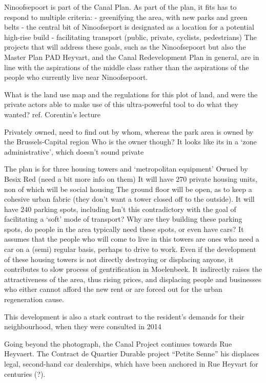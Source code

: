 \documentclass{article}[11pt]
\begin{document}
Ninoofsepoort is part of the Canal Plan. As part of the plan, it fits has to respond to multiple criteria:\cite{diagnosticNinove}
- greenifying the area, with new parks and green belts
- the central bit of Ninoofseport is designated as a location for a potential high-rise build
- facilitating transport (public, private, cyclists, pedestrians)
The projects that will address these goals, such as the Ninoofsepoort but also the Master Plan PAD Heyvart, and the Canal Redevelopment Plan in general, are in line with the aspirations of the middle class rather than the aspirations of the people who currently live near Ninoofsepoort. 

What is the land use map and the regulations for this plot of land, and were the private actors able to make use of this ultra-powerful tool to do what they wanted? ref. Corentin's lecture

Privately owned, need to find out by whom, whereas the park area is owned by the Brussels-Capital region
Who is the owner though? It looks like its in a `zone administrative', which doesn't sound private

The plan is for three housing towers and `metropolitan equipment' 
Owned by Besix Red (need a bit more info on them)
It will have 270 private housing units, non of which will be social housing
The ground floor will be open, as to keep a cohesive urban fabric (they don't want a tower closed off to the outside). 
It will have 240 parking spots, including 
Isn't this contradictory with the goal of facilitating a `soft' mode of transport? Why are they building these parking spots, do people in the area typically need these spots, or even have cars? It assumes that the people who will come to live in this towers are ones who need a car on a (semi) regular basis, perhaps to drive to work.
Even if the development of these housing towers is not directly destroying or displacing anyone, it contributes to slow process of gentrification in Moelenbeek. It indirectly raises the attractiveness of the area, thus rising prices, and displacing people and businesses who either cannot afford the new rent or are forced out for the urban regeneration cause. 

This development is also a stark contrast to the resident's demands for their neighbourhood, when they were consulted in 2014

Going beyond the photograph, the Canal Project continues towards Rue Heyvaert. The Contract de Quartier Durable project ``Petite Senne'' his displaces legal, second-hand car dealerships, which have been anchored in Rue Heyvart for centuries (?). 
\end{document}
